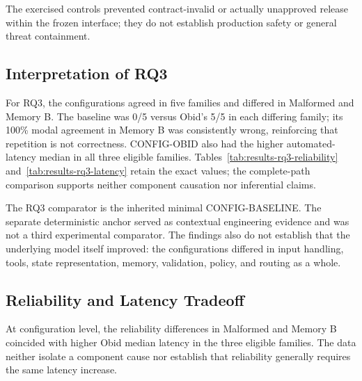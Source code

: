The exercised controls prevented contract-invalid or actually unapproved
release within the frozen interface; they do not establish production safety or
general threat containment.

\subsection{Interpretation of RQ3}\label{subsec:discussion-rq3}

For RQ3, the configurations agreed in five families and differed in Malformed
and Memory B. The baseline was 0/5 versus Obid's 5/5 in each differing family;
its 100\% modal agreement in Memory B was consistently wrong, reinforcing that
repetition is not correctness. CONFIG-OBID also had the higher automated-latency
median in all three eligible families. Tables~\ref{tab:results-rq3-reliability}
and~\ref{tab:results-rq3-latency} retain the exact values; the complete-path
comparison supports neither component causation nor inferential claims.

The RQ3 comparator is the inherited minimal CONFIG-BASELINE. The separate
deterministic anchor served as contextual engineering evidence and was not a
third experimental comparator. The findings also do not establish that the
underlying model itself improved: the configurations differed in input handling,
tools, state representation, memory, validation, policy, and routing as a whole.

\subsection{Reliability and Latency Tradeoff}\label{subsec:discussion-tradeoff}

At configuration level, the reliability differences in Malformed and Memory B
coincided with higher Obid median latency in the three eligible families. The
data neither isolate a component cause nor establish that reliability generally
requires the same latency increase.

